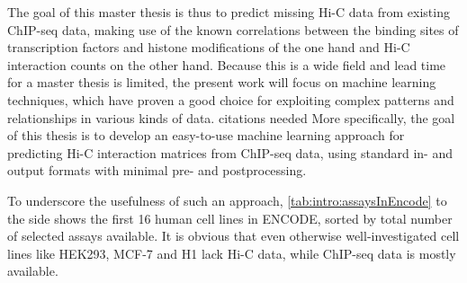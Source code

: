 The goal of this master thesis is thus to predict missing Hi-C data from existing ChIP-seq data,
making use of the known correlations between the binding sites of transcription factors and histone modifications of the one hand 
and Hi-C interaction counts on the other hand. 
Because this is a wide field and lead time for a master thesis is limited, 
the present work will focus on machine learning techniques,
which have proven a good choice for exploiting complex patterns
and relationships in various kinds of data. \xxx citations needed
More specifically, the goal of this thesis is to develop an easy-to-use machine learning
approach for predicting Hi-C interaction matrices from ChIP-seq data, 
using standard in- and output formats with minimal pre- and postprocessing.

To underscore the usefulness of such an approach, \cref{tab:intro:assaysInEncode} to the side shows the first 16 human cell lines in ENCODE, 
sorted by total number of selected assays available.
It is obvious that even otherwise well-investigated cell lines like HEK293, MCF-7 and H1 lack Hi-C data, while ChIP-seq data is mostly available.


